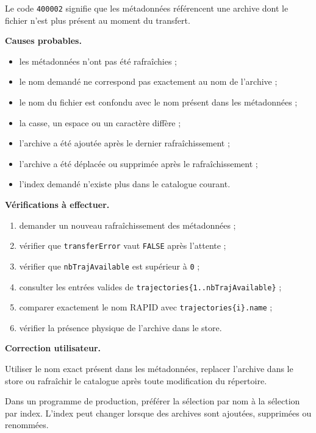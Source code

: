 \documentclass{rapportENSAM}
\begin{document}
Le code \texttt{400002} signifie que les métadonnées référencent une archive
dont le fichier n'est plus présent au moment du transfert.

\textbf{Causes probables.}

\begin{itemize}
    \item les métadonnées n'ont pas été rafraîchies ;
    \item le nom demandé ne correspond pas exactement au nom de l'archive ;
    \item le nom du fichier est confondu avec le nom présent dans les
    métadonnées ;
    \item la casse, un espace ou un caractère diffère ;
    \item l'archive a été ajoutée après le dernier rafraîchissement ;
    \item l'archive a été déplacée ou supprimée après le rafraîchissement ;
    \item l'index demandé n'existe plus dans le catalogue courant.
\end{itemize}

\textbf{Vérifications à effectuer.}

\begin{enumerate}
    \item demander un nouveau rafraîchissement des métadonnées ;
    \item vérifier que \texttt{transferError} vaut \texttt{FALSE} après
    l'attente ;
    \item vérifier que \texttt{nbTrajAvailable} est supérieur à
    \texttt{0} ;
    \item consulter les entrées valides de
    \texttt{trajectories\{1..nbTrajAvailable\}} ;
    \item comparer exactement le nom RAPID avec
    \texttt{trajectories\{i\}.name} ;
    \item vérifier la présence physique de l'archive dans le store.
\end{enumerate}

\textbf{Correction utilisateur.}

Utiliser le nom exact présent dans les métadonnées, replacer l'archive dans le
store ou rafraîchir le catalogue après toute modification du répertoire.

Dans un programme de production, préférer la sélection par nom à la sélection
par index. L'index peut changer lorsque des archives sont ajoutées, supprimées
ou renommées.


\end{document}

